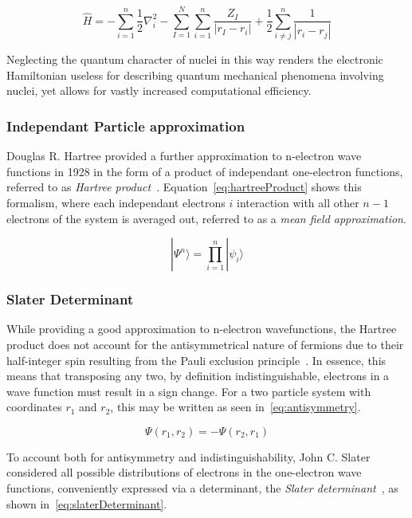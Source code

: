\documentclass[11pt]{article}
\begin{document}
\begin{equation}
  \hat{H} = -\sum_{i=1}^{n}\frac{1}{2}\nabla_i^2 -\sum_{I=1}^{N}\sum_{i=1}^{n}\frac{Z_I}{|r_I - r_i|} + \frac{1}{2}\sum_{i\neq j}^{n}\frac{1}{|r_i - r_j|}  \label{eq:electricHamiltonian}
\end{equation}

\bigskip

\noindent Neglecting the quantum character of nuclei in this way renders the electronic Hamiltonian useless for describing quantum mechanical phenomena involving nuclei, yet allows for vastly increased computational efficiency.

\subsubsection{Independant Particle approximation}
Douglas R. Hartree provided a further approximation to n-electron wave functions in 1928 in the form of a product of independant one-electron functions, referred to as \textit{Hartree product}~\cite{Hartree1928}.
Equation~\ref{eq:hartreeProduct} shows this formalism, where each independant electrons $i$ interaction with all other $n-1$ electrons of the system is averaged out, referred to as a \textit{mean field approximation}.

\begin{equation}
  |\Psi^{n}\rangle = \prod_{i=1}^{n}|\psi_i\rangle
  \label{eq:hartreeProduct}
\end{equation}

\subsubsection{Slater Determinant}
While providing a good approximation to n-electron wavefunctions, the Hartree product does not account for the antisymmetrical nature of fermions due to their half-integer spin resulting from the Pauli exclusion principle~\cite{Pauli1925}.
In essence, this means that transposing any two, by definition indistinguishable, electrons in a wave function must result in a sign change. For a two particle system with coordinates $r_1$ and $r_2$, this may be written as seen in~\ref{eq:antisymmetry}.

\begin{equation}
  \Psi(r_1, r_2) = -\Psi(r_2, r_1)
  \label{eq:antisymmetry}
\end{equation}

\bigskip

\noindent To account both for antisymmetry and indistinguishability, John C. Slater considered all possible distributions of electrons in the one-electron wave functions, conveniently expressed via a determinant, the \textit{Slater determinant}~\cite{Slater1929}, as shown in~\ref{eq:slaterDeterminant}.
\end{document}
